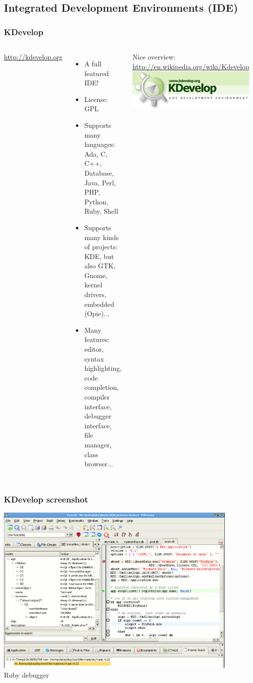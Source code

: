 \subsection[Source management \& IDEs]{Integrated
  Development Environments (IDE)}

\begin{frame}
  \frametitle{KDevelop}
  \begin{columns}[T]
    \url{http://kdevelop.org}
    \begin{itemize}
    \item A full featured IDE!
    \item License: GPL
    \item Supports many languages: Ada, C, C++, Database, Java, Perl,
      PHP, Python, Ruby, Shell
    \item Supports many kinds of projects: KDE, but also GTK, Gnome,
      kernel drivers, embedded (Opie)...
    \item Many features: editor, syntax highlighting, code completion,
      compiler interface, debugger interface, file manager, class
      browser...
    \end{itemize}
    Nice overview: \url{http://en.wikipedia.org/wiki/Kdevelop}
    \includegraphics[width=\textwidth]{slides/sysdev-application-development/kdevelop.png}
  \end{columns}
\end{frame}

\begin{frame}
  \frametitle{KDevelop screenshot}
  \begin{center}
    \includegraphics[width=0.9\textwidth]{slides/sysdev-application-development/kdevelop-screenshot.png}\\
    Ruby debugger
  \end{center}
\end{frame}

